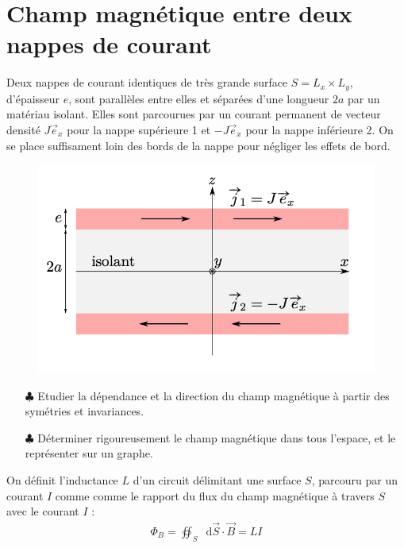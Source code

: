 \documentclass{report}
\newcommand*\dif{\mathop{}\!\mathrm{d}}
\begin{document}
\newpage

\section*{Champ magnétique entre deux nappes de courant}

Deux nappes de courant identiques de très grande surface $S = L_x\times L_y$, d’épaisseur $e$, sont parallèles entre elles et séparées d’une longueur $2a$ par un matériau isolant. Elles sont parcourues par un courant permanent de vecteur densité $J\vec{e}_x$ pour la nappe supérieure 1 et $-J\vec{e}_x$ pour la nappe inférieure 2. On se place suffisament loin des bords de la nappe pour négliger les effets de bord.

\begin{figure}[h!]
\centering
		\includegraphics[scale=0.7]{nappe_courant.png}
\end{figure}

\begin{itemize}
	
	\item[$\clubsuit$] Etudier la dépendance et la direction du champ magnétique à partir des symétries et invariances.
	
	\item[$\clubsuit$] Déterminer rigoureusement le champ magnétique dans tous l'espace, et le représenter sur un graphe.
	
\end{itemize}

On définit l'inductance $L$ d'un circuit délimitant une surface $S$, parcouru par un courant $I$ comme  comme le rapport du flux du champ magnétique à travers $S$ avec le courant $I$ :
	\begin{align*}
		\Phi_B=\oiint_S \dif \vec{S}\cdot\vec{B}=LI
	\end{align*}
\end{document}
